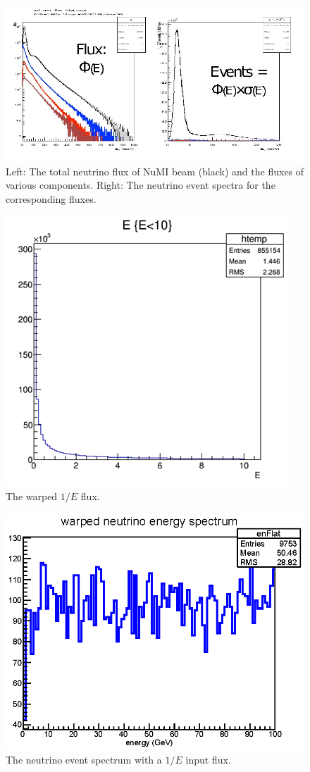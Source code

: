 \documentclass[12pt,a4paper,final]{iopart}
\begin{document}
\begin{figure}
  \centering
  \includegraphics[width=.7\textwidth]{figures/2015/NuMI_spectrum.jpg}
  \caption{Left: The total neutrino flux of NuMI beam (black) and the fluxes of various components. Right: The neutrino event spectra for the corresponding fluxes.}
  \label{fig:NuMISpec}
\end{figure}

\begin{figure}
  \centering
  \includegraphics[width=.4\textwidth]{figures/2015/inverseEflux.png}
  \caption{The warped $1/E$ flux.}
  \label{fig:inverseEflux}
\end{figure}

\begin{figure}
  \centering
  \includegraphics[width=.7\textwidth]{figures/2015/warped_event_spectrum.eps}
  \caption{The neutrino event spectrum with a $1/E$ input flux.}
  \label{fig:flatspec}
\end{figure}
\end{document}
